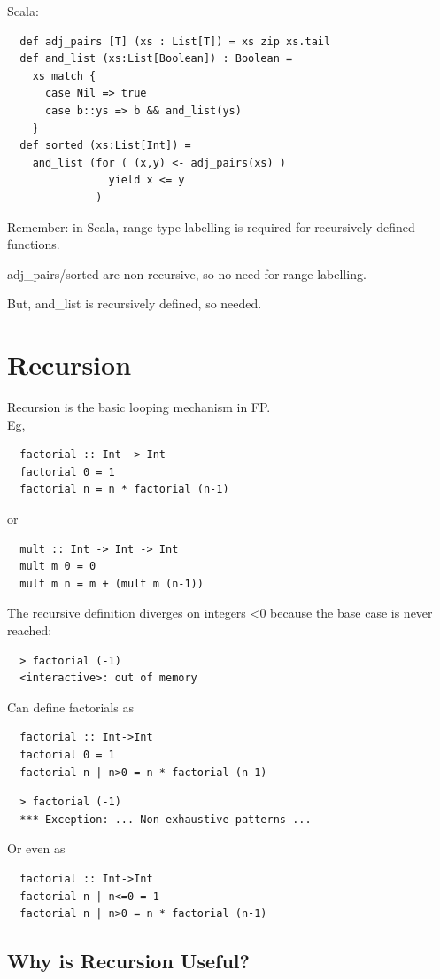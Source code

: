 \documentclass[tikz,border=10pt]{project_plan}
\begin{document}
Scala:
\begin{lstlisting}
  def adj_pairs [T] (xs : List[T]) = xs zip xs.tail
  def and_list (xs:List[Boolean]) : Boolean =
    xs match {
      case Nil => true
      case b::ys => b && and_list(ys)
    }
  def sorted (xs:List[Int]) =
    and_list (for ( (x,y) <- adj_pairs(xs) )
                yield x <= y
              )
\end{lstlisting}

Remember: in Scala, range type-labelling is required
for recursively defined functions.

adj\_pairs/sorted are non-recursive, so no need for
range labelling.

But, and\_list is recursively defined, so needed.


\section{Recursion}

Recursion is the basic looping mechanism in FP.\\
Eg,
\begin{lstlisting}
  factorial :: Int -> Int
  factorial 0 = 1
  factorial n = n * factorial (n-1)
\end{lstlisting}
or
\begin{lstlisting}
  mult :: Int -> Int -> Int
  mult m 0 = 0
  mult m n = m + (mult m (n-1))
\end{lstlisting}

The recursive definition diverges on integers \textless 0
because the base case is never reached:
\begin{lstlisting}
  > factorial (-1)
  <interactive>: out of memory
\end{lstlisting}
Can define factorials as
\begin{lstlisting}
  factorial :: Int->Int
  factorial 0 = 1
  factorial n | n>0 = n * factorial (n-1)
\end{lstlisting}
\begin{lstlisting}
  > factorial (-1)
  *** Exception: ... Non-exhaustive patterns ...
\end{lstlisting}
Or even as
\begin{lstlisting}
  factorial :: Int->Int
  factorial n | n<=0 = 1
  factorial n | n>0 = n * factorial (n-1)
\end{lstlisting}

\subsection{Why is Recursion Useful?}
\end{document}
